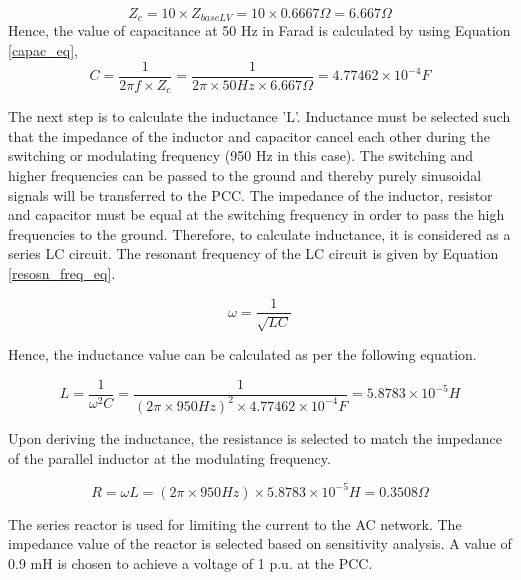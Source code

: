 \begin{equation}
    Z_c = 10 \times Z_{baseLV} = 10 \times 0.6667 \Omega = 6.667 \Omega   
\end{equation}
Hence, the value of capacitance at 50 Hz in Farad is calculated by using Equation \ref{capac_eq},
\begin{equation}\label{capac_eq}
    C = \frac{1}{2\pi f \times Z_c} = \frac{1}{2\pi \times 50 Hz \times 6.667\Omega} = 4.77462 \times 10^{-4} F
\end{equation}

The next step is to calculate the inductance 'L'. Inductance must be selected such that the impedance of the inductor and capacitor cancel each other during the switching or modulating frequency (950 Hz in this case). The switching and higher frequencies can be passed to the ground and thereby purely sinusoidal signals will be transferred to the \gls{PCC}. The impedance of the inductor, resistor and capacitor must be equal at the switching frequency in order to pass the high frequencies to the ground. Therefore, to calculate inductance, it is considered as a series LC circuit. The resonant frequency of the LC circuit is given by Equation \ref{resosn_freq_eq}.

\begin{equation}\label{resosn_freq_eq}
    \omega = \frac{1}{\sqrt{LC}}    
\end{equation}

Hence, the inductance value can be calculated as per the following equation.

\begin{equation}
    L = \frac{1}{\omega^2 C} = \frac{1}{(2\pi \times 950 Hz)^2 \times 4.77462 \times 10^{-4} F} = 5.8783 \times 10^{-5} H
\end{equation}

Upon deriving the inductance, the resistance is selected to match the impedance of the parallel inductor at the modulating frequency.

\begin{equation}
    R = \omega L = (2\pi \times 950 Hz) \times 5.8783 \times 10^{-5} H = 0.3508 \Omega
\end{equation}

The series reactor is used for limiting the current to the \gls{AC} network. The impedance value of the reactor is selected based on sensitivity analysis. A value of 0.9 mH is chosen to achieve a voltage of 1 p.u. at the \gls{PCC}.

